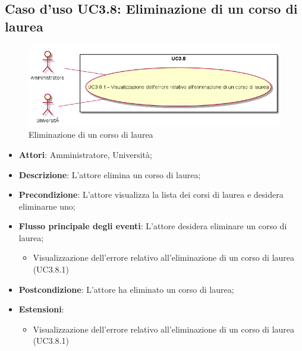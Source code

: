 \subsection{Caso d'uso \texorpdfstring{UC3.8}{UC3.8}: Eliminazione di un corso di laurea}
\begin{figure} [H]
\centering
\includegraphics[scale=0.45]{./img/UC3-8.png}
\caption{Eliminazione di un corso di laurea}\label{}
\end{figure}
\begin{itemize}
\item \textbf{Attori}: Amministratore, Università;
\item \textbf{Descrizione}: L'attore elimina un corso di laurea;

\item \textbf{Precondizione}: L'attore visualizza la lista dei corsi di laurea e desidera eliminarne uno;

\item \textbf{Flusso principale degli eventi}: L'attore desidera eliminare un corso di laurea;

\begin{itemize}
\item Visualizzazione dell'errore relativo all'eliminazione di un corso di laurea (UC3.8.1)
\end{itemize}
\item \textbf{Postcondizione}: L'attore ha eliminato un corso di laurea;

\item \textbf{Estensioni}:
\begin{itemize}
\item Visualizzazione dell'errore relativo all'eliminazione di un corso di laurea (UC3.8.1)
\end{itemize}
\end{itemize}
